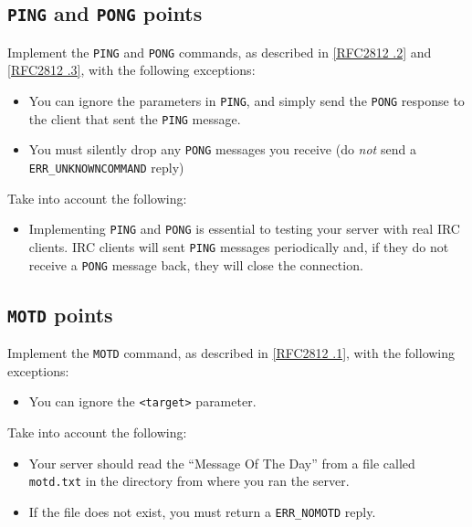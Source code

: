 \documentclass[10pt]{article}
\newcommand{\RFCsection}[2]{\href{http://tools.ietf.org/html/rfc#1\#section-#2}{[RFC#1 \textsection #2]}}
\newcommand{\points}[1]{{\sffamily\mdseries\guillemotleft #1 points\guillemotright{}}}
\begin{document}
\subsection{\texttt{PING} and \texttt{PONG} \points{2.5}}

Implement the \texttt{PING} and \texttt{PONG} commands, as described in \RFCsection{2812}{3.7.2} and \RFCsection{2812}{3.7.3}, with the following exceptions:

\begin{itemize}
\item You can ignore the parameters in \texttt{PING}, and simply send the \texttt{PONG} response to the client that sent the \texttt{PING} message.
\item You must silently drop any \texttt{PONG} messages you receive (do \emph{not} send a \texttt{ERR\_UNKNOWNCOMMAND} reply)
\end{itemize}

\noindent Take into account the following:

\begin{itemize}
\item Implementing \texttt{PING} and \texttt{PONG} is essential to testing your server with real IRC clients. IRC clients will sent \texttt{PING} messages periodically and, if they do not receive a \texttt{PONG} message back, they will close the connection.
\end{itemize}

\subsection{\texttt{MOTD} \points{5}}

Implement the \texttt{MOTD} command, as described in \RFCsection{2812}{3.4.1}, with the following exceptions:

\begin{itemize}
\item You can ignore the \texttt{<target>} parameter.
\end{itemize}

\noindent Take into account the following:

\begin{itemize}
\item Your server should read the ``Message Of The Day'' from a file called \texttt{motd.txt} in the directory from where you ran the server.
\item If the file does not exist, you must return a \texttt{ERR\_NOMOTD} reply.
\end{itemize}
\end{document}
